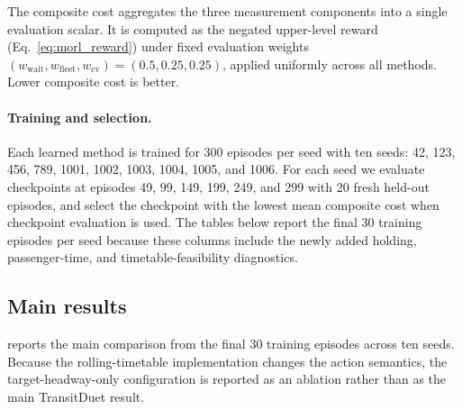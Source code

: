 The composite cost aggregates the three measurement components into a single evaluation scalar. It is computed as the negated upper-level reward (Eq.~\ref{eq:morl_reward}) under fixed evaluation weights $(w_{\mathrm{wait}}, w_{\mathrm{fleet}}, w_{\mathrm{cv}}) = (0.5, 0.25, 0.25)$, applied uniformly across all methods. Lower composite cost is better.

\paragraph{Training and selection.}
Each learned method is trained for 300 episodes per seed with ten seeds: 42, 123, 456, 789, 1001, 1002, 1003, 1004, 1005, and 1006. For each seed we evaluate checkpoints at episodes 49, 99, 149, 199, 249, and 299 with 20 fresh held-out episodes, and select the checkpoint with the lowest mean composite cost when checkpoint evaluation is used. The tables below report the final 30 training episodes per seed because these columns include the newly added holding, passenger-time, and timetable-feasibility diagnostics.

\subsection{Main results}
\label{sec:main_results}

 reports the main comparison from the final 30 training episodes across ten seeds. Because the rolling-timetable implementation changes the action semantics, the target-headway-only configuration is reported as an ablation rather than as the main TransitDuet result.


